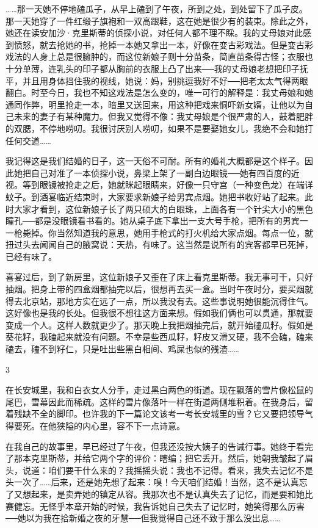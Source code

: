……那一天她不停地磕瓜子，从早上磕到了午夜，所到之处，到处留下了瓜子皮。那一天她穿了一件红缎子旗袍和一双高跟鞋，这在她是很少有的装束。除此之外，她还在读安加沙·克里斯蒂的侦探小说，对任何人都不理不睬。我的丈母娘对此感到愤怒，就去抢她的书，抢掉一本她又拿出一本，好像在变古彩戏法。但是变古彩戏法的人身上总是很臃肿的，而这位新娘子则十分苗条，简直苗条得古怪；衣服也十分单薄，连乳头的印子都从胸前的衣服上凸了出来──我的丈母娘老想把印子抚平，并且用身体挡住我的视线，她说：妈，别挑逗我好不好──把老太太气得两眼翻白。时至今日，我也不知这戏法是怎么变的，唯一可行的解释是：我丈母娘和她通同作弊，明里抢走一本，暗里又送回来，用这种把戏来恫吓新女婿，让他以为自己未来的妻子有某种魔力。但我又觉得不像：我丈母娘是个很严肃的人，鼓着肥胖的双腮，不停地唠叨。我很讨厌别人唠叨，如果不是要娶她女儿，我绝不会和她打任何交道…… 

我记得这是我们结婚的日子，这一天俗不可耐。所有的婚礼大概都是这个样子。因此她把自己对准了一本侦探小说，鼻梁上架了一副白边眼镜──她有四百度的近视。等到眼镜被抢走之后，她就眯起眼睛来，好像一只守宫（一种变色龙）在端详蚊子。到酒宴临近结束时，大家要求新娘子给男宾点烟。她把书收好站了起来。此时大家才看到，这位新娘子长了两只硕大的白眼珠，上面各有一个针尖大小的黑色瞳孔──都是没眼镜看书看的。她从桌子底下拿出一支大号手枪，把所有的男宾一一枪毙掉。你当然知道我的意思，她用手枪式的打火机给大家点烟。每点一位，就扭过头去闻闻自己的腋窝说：天热，有味了。这当然是说所有的宾客都早已死掉，已经有味了。 

喜宴过后，到了新房里，这位新娘子又歪在了床上看克里斯蒂。我无事可干，只好抽烟。把身上带的四盒烟都抽完以后，很想再去买一盒。当时午夜时分，要买烟就得去北京站，那地方实在远了一点，所以我没有去。这些事说明她很能沉得住气。这好像也是我的长处。但我很不想往这方面来想。假如我们俩也可以贯通，那就要变成一个人。这样人数就更少了。那天晚上我把烟抽完后，就开始磕瓜籽。假如是葵花籽，我磕起来就没有问题。不幸是些西瓜籽，籽皮又滑又硬，我不会磕，磕来磕去，磕不到籽仁，只是吐出些黑白相间、鸡屎也似的残渣…… 

3 

在长安城里，我和白衣女人分手，走过黑白两色的街道。现在飘落的雪片像松鼠的尾巴，雪幕因此而稀疏。这样的雪片像落叶一样在街道两侧堆积着。在我身后，留着残缺不全的脚印。也许我的下一篇论文该考一考长安城里的雪？它又要把领导气得要死。在他狭隘的内心里，容不下一点诗意。 

在我自己的故事里，早已经过了午夜，但我还没按大姨子的告诫行事。她终于看完了那本克里斯蒂，并给它两个字的评价：瞎编；把它丢开。然后，她朝我皱起了眉头，说道：咱们要干什么来的？我摇摇头说：我也不记得。看来，我失去记忆不是头一次了……后来，还是她先想了起来：嗅！今天咱们结婚！当然，这不是认真忘了又想起来，是卖弄她的镇定从容。我那次也不是认真失去了记忆，而是要和她比赛健忘。无怪乎本章开始的时候，我告诉她自己失去了记忆时，她笑得那么厉害──她以为我在拾新婚之夜的牙慧──但我觉得自己还不致于那么没出息…… 

